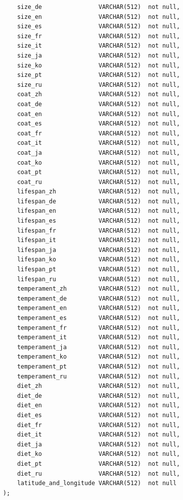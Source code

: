 \begin{verbatim}
    size_de                VARCHAR(512)  not null,
    size_en                VARCHAR(512)  not null,
    size_es                VARCHAR(512)  not null,
    size_fr                VARCHAR(512)  not null,
    size_it                VARCHAR(512)  not null,
    size_ja                VARCHAR(512)  not null,
    size_ko                VARCHAR(512)  not null,
    size_pt                VARCHAR(512)  not null,
    size_ru                VARCHAR(512)  not null,
    coat_zh                VARCHAR(512)  not null,
    coat_de                VARCHAR(512)  not null,
    coat_en                VARCHAR(512)  not null,
    coat_es                VARCHAR(512)  not null,
    coat_fr                VARCHAR(512)  not null,
    coat_it                VARCHAR(512)  not null,
    coat_ja                VARCHAR(512)  not null,
    coat_ko                VARCHAR(512)  not null,
    coat_pt                VARCHAR(512)  not null,
    coat_ru                VARCHAR(512)  not null,
    lifespan_zh            VARCHAR(512)  not null,
    lifespan_de            VARCHAR(512)  not null,
    lifespan_en            VARCHAR(512)  not null,
    lifespan_es            VARCHAR(512)  not null,
    lifespan_fr            VARCHAR(512)  not null,
    lifespan_it            VARCHAR(512)  not null,
    lifespan_ja            VARCHAR(512)  not null,
    lifespan_ko            VARCHAR(512)  not null,
    lifespan_pt            VARCHAR(512)  not null,
    lifespan_ru            VARCHAR(512)  not null,
    temperament_zh         VARCHAR(512)  not null,
    temperament_de         VARCHAR(512)  not null,
    temperament_en         VARCHAR(512)  not null,
    temperament_es         VARCHAR(512)  not null,
    temperament_fr         VARCHAR(512)  not null,
    temperament_it         VARCHAR(512)  not null,
    temperament_ja         VARCHAR(512)  not null,
    temperament_ko         VARCHAR(512)  not null,
    temperament_pt         VARCHAR(512)  not null,
    temperament_ru         VARCHAR(512)  not null,
    diet_zh                VARCHAR(512)  not null,
    diet_de                VARCHAR(512)  not null,
    diet_en                VARCHAR(512)  not null,
    diet_es                VARCHAR(512)  not null,
    diet_fr                VARCHAR(512)  not null,
    diet_it                VARCHAR(512)  not null,
    diet_ja                VARCHAR(512)  not null,
    diet_ko                VARCHAR(512)  not null,
    diet_pt                VARCHAR(512)  not null,
    diet_ru                VARCHAR(512)  not null,
    latitude_and_longitude VARCHAR(512)  not null
);


\end{verbatim}

